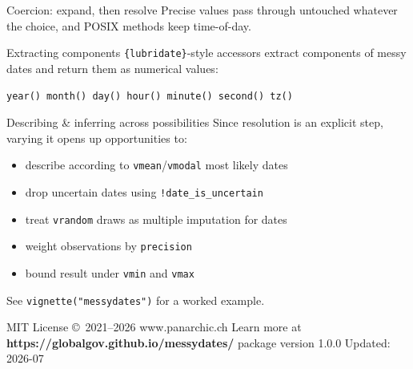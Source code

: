 \documentclass[9pt]{extarticle}
\let\code\verb
\begin{document}
\begin{minipage}[t]{0.323\textwidth}
\begin{mdbox}{Coercion: expand, then resolve}
Precise values pass through untouched whatever the choice,
and POSIX methods keep time-of-day.
\end{mdbox}

\begin{mdbox}{Extracting components}
\code|{lubridate}|-style accessors extract components of messy dates and return them as numerical values:
\begin{center}
\code|year() month() day() hour() minute() second() tz()|
\end{center}
\end{mdbox}

\begin{greybox}{Describing \& inferring across possibilities}
Since resolution is an explicit step, varying it opens up opportunities to:

\begin{itemize}
  \item describe according to \code|vmean|/\code|vmodal| most likely dates
  \item drop uncertain dates using \code|!date_is_uncertain|
  \item treat \code|vrandom| draws as multiple imputation for dates
  \item weight observations by \code|precision|
  \item bound result under \code|vmin| and \code|vmax|
\end{itemize}

See \code|vignette("messydates")| for a worked example.
\end{greybox}
\end{minipage}

\vfill
{\scriptsize\color{mdink}
MIT License \copyright\ 2021--2026 \; \textbullet\; www.panarchic.ch \; \textbullet\;
Learn more at \textbf{https://globalgov.github.io/messydates/} \; \textbullet\;
package version 1.0.0 \; \textbullet\; Updated: 2026-07}
\end{document}
